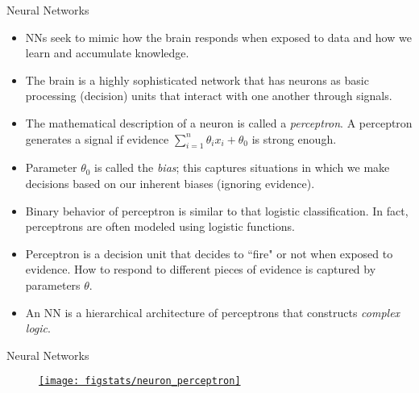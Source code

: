 \documentclass[9pt]{beamer}
\begin{document}

\begin{frame}{Neural Networks}

\begin{itemize}
   \setlength{\itemsep}{5pt}
\item NNs seek to mimic how the brain responds when exposed to data and how we learn and accumulate knowledge. 

\item The brain is a highly sophisticated network that has neurons as basic processing (decision) units that interact with one another through signals. 

\item  The mathematical description of a neuron is called a {\em perceptron}. A perceptron generates a signal if evidence $\sum_{i=1}^n\theta_ix_i+\theta_0$ is strong enough. 

\item Parameter $\theta_0$ is called the {\em bias}; this captures situations in which we make decisions based on our inherent biases (ignoring evidence). 

\item Binary behavior of perceptron is similar to that logistic classification. In fact, perceptrons are often modeled using logistic functions. 

\item Perceptron is a decision unit that decides to ``fire" or not when exposed to evidence. How to respond to different pieces of evidence is captured by parameters $\theta$.   
 
\item An NN is a hierarchical architecture of perceptrons that constructs {\em complex logic}. 
\end{itemize}

\end{frame}


\begin{frame}{Neural Networks}

\begin{figure}[!htb]
    \centering
	\href{http://dataskunkworks.com/2018/03/22/building-an-artificial-neuron-in-python-the-perceptron}{\texttt{[image: figstats/neuron\_perceptron]}}
\end{figure}

\end{frame}
\end{document}
